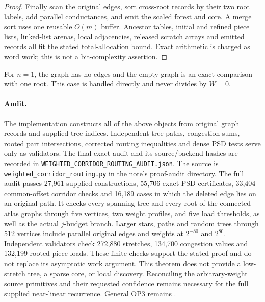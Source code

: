 \begin{proof}
Finally scan the original edges, sort cross-root records by their
two root labels, add parallel conductances, and emit the scaled forest
and core. A merge sort uses one reusable $O(m)$ buffer. Ancestor
tables, initial and refined piece lists, linked-list arenas, local
adjacencies, released scratch arrays and emitted records all fit the
stated total-allocation bound. Exact arithmetic is charged as word
work; this is not a bit-complexity assertion.
\end{proof}

For $n=1$, the graph has no edges and the empty graph is an exact
comparison with one root. This case is handled directly and never
divides by $W=0$.

\paragraph{Audit.}
The implementation constructs all of the above objects from original graph records and
supplied tree indices. Independent tree paths, congestion sums, rooted
part intersections, corrected routing inequalities and dense PSD tests
serve only as validators. The final exact audit and its source/backend
hashes are recorded in \texttt{WEIGHTED\_CORRIDOR\_ROUTING\_AUDIT.json}.
The source is \texttt{weighted\_corridor\_routing.py} in the note's
proof-audit directory.
The full audit passes 27,961 supplied constructions, 55,706 exact PSD
certificates, 33,404 common-offset corridor checks and 16,189 cases
in which the deleted edge lies on an original path. It checks every
spanning tree and every root of the connected atlas graphs through
five vertices, two weight profiles, and five load thresholds, as well
as the actual $j$-budget branch. Larger stars, paths and random trees
through 512 vertices include parallel original edges and weights at
$2^{-80}$ and $2^{80}$. Independent validators check 272,880 stretches,
134,700 congestion values and 132,199 rooted-piece loads. These finite
checks support the stated proof and do not replace its asymptotic work
argument.
This theorem does not provide a low-stretch tree, a sparse core, or
local discovery. Reconciling the arbitrary-weight source primitives and
their requested confidence remains necessary for the full supplied
near-linear recurrence. General OP3 remains \statusopen.

